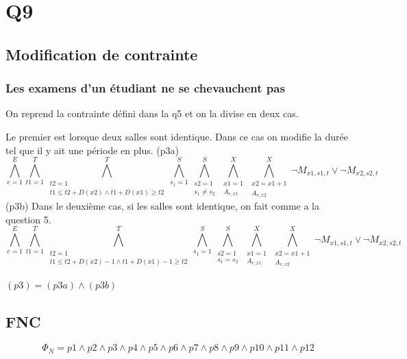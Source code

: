 \documentclass[a4paper,11pt]{article}
\begin{document}
\section{Q9}

\subsection{Modification de contrainte}
\subsubsection{Les examens d'un étudiant ne se chevauchent pas}
On reprend la contrainte défini dans la q5 et on la divise en deux cas. 

Le premier est lorsque deux salles sont identique. Dans ce cas on modifie la durée tel que il y ait une période en plus.
(p3a)
\begin{displaymath}
\bigwedge\limits_{e=1}^{E}\bigwedge\limits_{t1=1}^{T}\bigwedge\limits_{\substack{t2=1 \\ t1 \leq t2 + D(x2) \wedge t1 + D(x1) \geq t2}}^{T}\bigwedge\limits_{s_{1}=1}^{S}\bigwedge\limits_{\substack{s2=1 \\ s_{1} \neq s_{2}}}^{S}\bigwedge\limits_{\substack{x1=1 \\ A_{e,x1}}}^{X}\bigwedge\limits_{\substack{x2=x1+1 \\ A_{e,x2}}}^{X} \neg M_{x1, s1, t} \vee \neg M_{x2, s2, t}
\end{displaymath}
(p3b)
Dans le deuxième cas, si les salles sont identique, on fait comme a la question 5.
\begin{displaymath}
\bigwedge\limits_{e=1}^{E}\bigwedge\limits_{t1=1}^{T}\bigwedge\limits_{\substack{t2=1 \\ t1 \leq t2 + D(x2)-1 \wedge t1 + D(x1)-1 \geq t2}}^{T}\bigwedge\limits_{s_{1}=1}^{S}\bigwedge\limits_{\substack{s2=1 \\ s_{1} = s_{2}}}^{S}\bigwedge\limits_{\substack{x1=1 \\ A_{e,x1}}}^{X}\bigwedge\limits_{\substack{x2=x1+1 \\ A_{e,x2}}}^{X} \neg M_{x1, s1, t} \vee \neg M_{x2, s2, t}
\end{displaymath}

$ (p3) = (p3a) \wedge (p3b) $
\subsection{FNC}
\begin{displaymath}
	\Phi_{N} = p1 \wedge p2 \wedge p3 \wedge p4 \wedge p5 \wedge p6 \wedge p7 \wedge p8 \wedge p9 \wedge p10 \wedge p11 \wedge p12
\end{displaymath}
\end{document}
